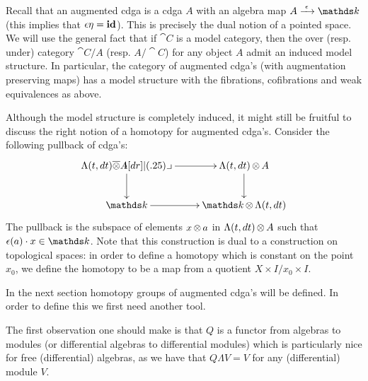
Recall that an augmented cdga is a cdga $A$ with an algebra map $A \tot{\counit} \k$ (this implies that $\epsilon \eta = \mathbf{id}$). This is precisely the dual notion of a pointed space. We will use the general fact that if $\cat{C}$ is a model category, then the over (resp. under) category $\cat{C} / A$ (resp. $A / \cat{C}$) for any object $A$ admit an induced model structure. In particular, the category of augmented cdga's (with augmentation preserving maps) has a model structure with the fibrations, cofibrations and weak equivalences as above.

Although the model structure is completely induced, it might still be fruitful to discuss the right notion of a homotopy for augmented cdga's. Consider the following pullback of cdga's:
\[ \xymatrix{
	\Lambda(t, dt) \overline{\tensor} A \ar[r] \xypb \ar[d] & \Lambda(t, dt) \tensor A \ar[d] \\
	\k \ar[r] & \k \tensor \Lambda(t, dt)
}\]
The pullback is the subspace of elements $x \operatorname*{\otimes} a$ in $\Lambda(t, dt) \operatorname*{\otimes} A$ such that $\counit(a) \cdot x \in \k$. Note that this construction is dual to a construction on topological spaces: in order to define a homotopy which is constant on the point $x_0$, we define the homotopy to be a map from a quotient ${X \times I} / {x_0 \times I}$.

In the next section homotopy groups of augmented cdga's will be defined. In order to define this we first need another tool.

The first observation one should make is that $Q$ is a functor from algebras to modules (or differential algebras to differential modules) which is particularly nice for free (differential) algebras, as we have that $Q \Lambda V = V$ for any (differential) module $V$.

